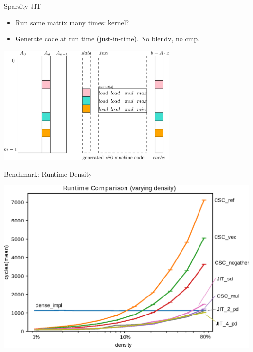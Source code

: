 \documentclass[table]{beamer}
\begin{document}
\begin{frame}[t]{Sparsity JIT}
	\begin{itemize}
	    \item Run same matrix many times: kernel?
	    \item Generate code at run time (just-in-time). No blendv, no cmp.
	\end{itemize}
	\begin{center}
	    \includegraphics[width=90mm]{sparsity/jit.eps}
	\end{center}
\end{frame}


\begin{frame}{Benchmark: Runtime Density}
	\begin{center}
	    \includegraphics[scale=0.67]{plots/csc_jit_runtime.eps}
	\end{center}
\end{frame}
\end{document}
